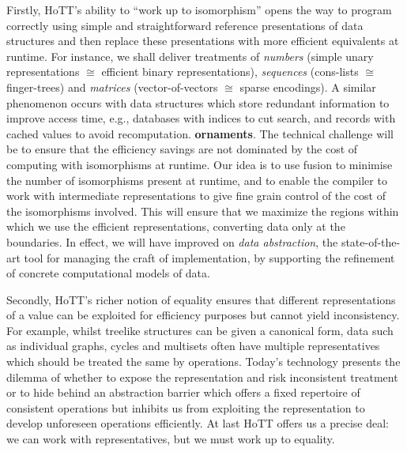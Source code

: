 \documentclass[a4paper,11pt]{article}
\begin{document}
Firstly, HoTT's ability to ``work up to isomorphism'' opens the way to
program correctly using simple and straightforward reference
presentations of data structures and then replace these presentations
with more efficient equivalents at runtime. For instance, we shall
deliver treatments of \emph{numbers} (simple unary representations $\cong$
efficient binary representations), \emph{sequences} (cons-lists $\cong$
finger-trees) and \emph{matrices} (vector-of-vectors $\cong$ sparse
encodings). %
A similar phenomenon occurs with data structures which store redundant
information to improve access time, e.g., databases with indices to
cut search, and records with cached values to avoid
recomputation. {\bf ornaments}. The technical challenge will be to
ensure that the efficiency savings are not dominated by the cost of
computing with isomorphisms at runtime. Our idea is to use fusion to
minimise the number of isomorphisms present at runtime, and to enable
the compiler to work with intermediate representations to give fine
grain control of the cost of the isomorphisms involved.  This will
ensure that we maximize the regions within which we use the efficient
representations, converting data only at the boundaries.  In effect,
we will have improved on \emph{data abstraction}, the state-of-the-art
tool for managing the craft of implementation, by supporting the
refinement of concrete computational models of data.

Secondly, HoTT's richer notion of equality ensures that different
representations of a value can be exploited for efficiency purposes
but cannot yield inconsistency. For example, whilst treelike
structures can be given a canonical form, data such as individual graphs, cycles
and multisets often have multiple representatives which should be
treated the same by operations. Today's technology presents the
dilemma of whether to expose the representation and risk inconsistent
treatment or to hide behind an abstraction barrier which offers a
fixed repertoire of consistent operations but inhibits us from
exploiting the representation to develop unforeseen operations
efficiently. At last HoTT offers us a precise deal: we can work with
representatives, but we must work up to equality. 

\vspace*{-0.2in}
\end{document}
